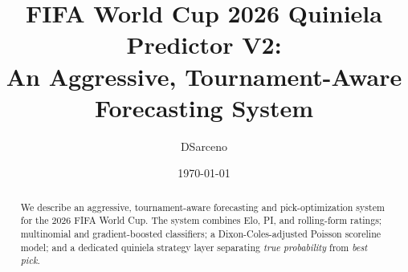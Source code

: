 \documentclass[11pt,a4paper]{article}
\title{FIFA World Cup 2026 Quiniela Predictor V2:\\
An Aggressive, Tournament-Aware Forecasting System}
\author{DSarceno}
\date{\today}
\begin{document}
\maketitle

\begin{abstract}
We describe an aggressive, tournament-aware forecasting and pick-optimization
system for the 2026 FIFA World Cup. The system combines Elo, PI, and rolling-form
ratings; multinomial and gradient-boosted classifiers; a Dixon-Coles-adjusted
Poisson scoreline model; and a dedicated quiniela strategy layer separating
\emph{true probability} from \emph{best pick}.
\end{abstract}










\end{document}
